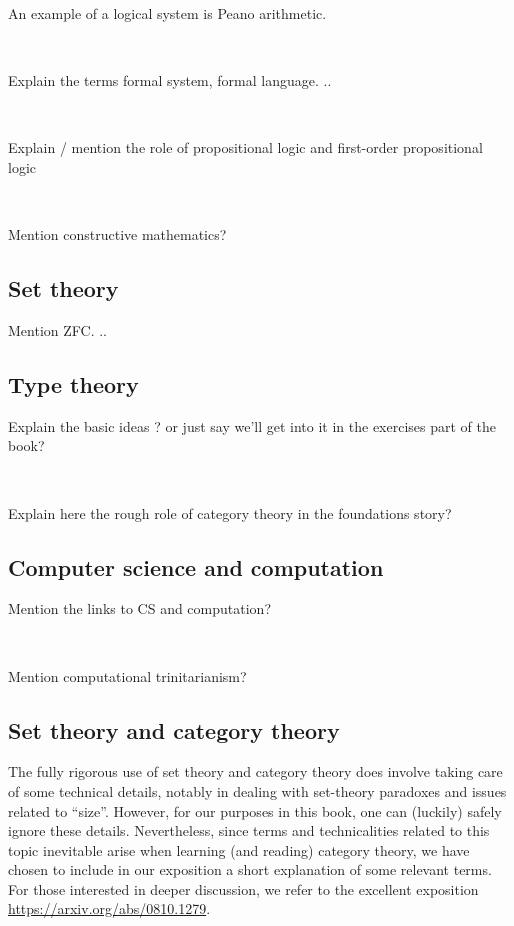 An example of a logical system is Peano arithmetic.

\

Explain the terms formal system, formal language.
..

\

Explain / mention the role of propositional logic and first-order propositional logic

\

Mention constructive mathematics?

\subsection{Set theory}

Mention ZFC.
..

\subsection{Type theory}

Explain the basic ideas ?
or just say we'll get into it in the exercises part of the book?

\

Explain here the rough role of category theory in the foundations story?

\subsection{Computer science and computation}

Mention the links to CS and computation?

\

Mention computational trinitarianism?

\subsection{Set theory and category theory}

The fully rigorous use of set theory and category theory does involve taking care of some technical details, notably in dealing with set-theory paradoxes and issues related to ``size''.
However, for our purposes in this book, one can (luckily) safely ignore these details.
Nevertheless, since terms and technicalities related to this topic inevitable arise when learning (and reading) category theory, we have chosen to include in our exposition a short explanation of some relevant terms.
For those interested in deeper discussion, we refer to the excellent exposition \url{https://arxiv.org/abs/0810.1279}.


